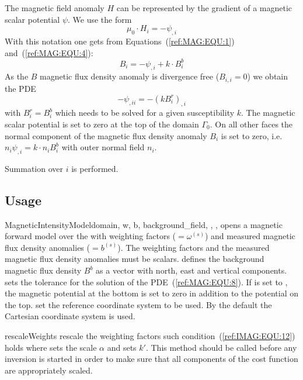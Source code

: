 The magnetic field anomaly $H$ can be represented by the gradient of a
magnetic scalar potential $\psi$.
We use the form 
\begin{equation}\label{ref:IMAG:EQU:6}
\mu_0  \cdot H_i = - \psi_{,i}
\end{equation}
With this notation one gets from Equations~(\ref{ref:MAG:EQU:1}) and~(\ref{ref:MAG:EQU:4}):
\begin{equation}\label{ref:IMAG:EQU:7}
B_i = - \psi_{,i}  + k \cdot B^b_i
\end{equation}
As the $B$ magnetic flux density anomaly is divergence free ($B_{i,i}=0$) we obtain the PDE
\begin{equation}\label{ref:IMAG:EQU:8}
- \psi_{,ii} = - (k B^r_i)_{,i} 
\end{equation} 
with $B^r_i=B^b_i$ which needs to be solved for a given susceptibility $k$.
The magnetic scalar potential is set to zero at the top of the domain
$\Gamma_{0}$.
On all other faces the normal component of the magnetic flux density anomaly
$B_i$ is set to zero, i.e. $n_i \psi_{,i} = k \cdot n_i  B^b_i$ with outer
normal field $n_i$.

Summation over $i$ is performed.


\subsection{Usage}

\begin{classdesc}{MagneticIntensityModel}{domain, w, b, background_field,
        ,
        ,
}
opens a magnetic forward model over the \Domain {} with 
weighting factors  ($=\omega^{(s)}$) and measured magnetic flux
density anomalies  ($=b^{(s)}$).
The weighting factors and the  measured magnetic flux density anomalies must be scalars.
 defines the background magnetic flux density $B^b$
as a vector with north, east and vertical components. 
 sets the tolerance for the solution of the PDE~(\ref{ref:MAG:EQU:8}).
If  is set to  \True, the magnetic potential 
at the bottom is set to zero in addition to the potential on the top. 
 set the reference coordinate system to be used. By the default the 
Cartesian coordinate system is used.
\end{classdesc}

\begin{methoddesc}[MagneticModel]{rescaleWeights}{
 }
rescale the weighting factors such condition~(\ref{ref:IMAG:EQU:12}) holds where 
 sets the scale $\alpha$
and  sets $k'$. This method should be called before any inversion is started
in order to make sure that all components of the cost function are appropriately scaled.
\end{methoddesc}


